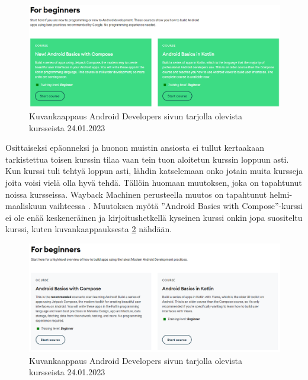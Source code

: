 \begin{figure}[h!]
  \includegraphics[width=\textwidth]{figures/android-developers-training-courses-2023-01-24-wayback-machine.png}
  \caption{Kuvankaappaus Android Developers sivun tarjolla olevista kursseista 24.01.2023}
  \label{fig:android-developers-training-courses-2023-01-24-wayback-machine}
\end{figure}

Osittaiseksi epäonneksi ja huonon muistin ansiosta ei tullut kertaakaan
tarkistettua toisen kurssin tilaa vaan tein tuon aloitetun kurssin loppuun
asti. Kun kurssi tuli tehtyä loppun asti, lähdin katselemaan onko jotain muita
kursseja joita voisi vielä olla hyvä tehdä. Tällöin huomaan muutoksen, joka on
tapahtunut noissa kursseissa. Wayback Machinen perusteella muutos on tapahtunut
helmi-maaliskuun vaihteessa
\parencite{AndroidDevelopersTrainingCoursesWaybackMachine202302}
\parencite{AndroidDevelopersTrainingCoursesWaybackMachine202303}. Muutoksen
myötä ''Android Basics with Compose''-kurssi ei ole enää keskeneräinen ja
kirjoitushetkellä kyseinen kurssi onkin jopa suositeltu kurssi, kuten
kuvankaappauksesta \ref{fig:android-developers-training-courses-2023-05-23}
nähdään.

\begin{figure}[h!]
  \includegraphics[width=\textwidth]{figures/android-developers-training-courses-2023-05-23.png}
  \caption{Kuvankaappaus Android Developers sivun tarjolla olevista kursseista 24.01.2023}
  \label{fig:android-developers-training-courses-2023-05-23}
\end{figure}

